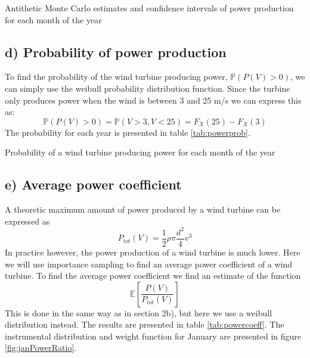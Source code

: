 \documentclass[a4paper]{article}
\begin{document}
\begin{table}[H]
    \centering
    \caption{Antithetic Monte Carlo estimates and confidence intervals of power production for each month of the year}
    \label{tab:ATresults}
    
\end{table}

\subsection*{d) Probability of power production}
To find the probability of the wind turbine producing power, $\mathbb{P}(P(V) > 0)$, we can simply use the weibull probability distribution function. Since the turbine only produces power when the wind is between 3 and 25 m/s we can express this as:
\begin{equation}
    \mathbb{P}(P(V) > 0) = \mathbb{P}(V > 3, V < 25) = F_X(25) - F_X(3)
\end{equation}
The probability for each year is presented in table \ref{tab:powerprob}.

\begin{table}[H]
    \centering
    \caption{Probability of a wind turbine producing power for each month of the year}
    \label{tab:powerprob}
    
\end{table}

\subsection*{e) Average power coefficient}
A theoretic maximum amount of power produced by a wind turbine can be expressed as
\begin{equation}
    P_{tot}(V) = \frac{1}{2}\rho\pi\frac{d^2}{4}v^3
\end{equation}
In practice however, the power production of a wind turbine is much lower. Here we will use importance sampling to find an average power coefficient of a wind turbine. To find the average power coefficient we find an estimate of the function
\begin{equation}
  \mathbb{E}[\frac{P(V)}{P_{tot}(V)}]
\end{equation}
This is done in the same way as in section 2b), but here we use a weibull distribution instead. The results are presented in table \ref{tab:powercoeff}. The instrumental distribution and weight function for January are presented in figure \ref{fig:janPowerRatio}.
\end{document}

